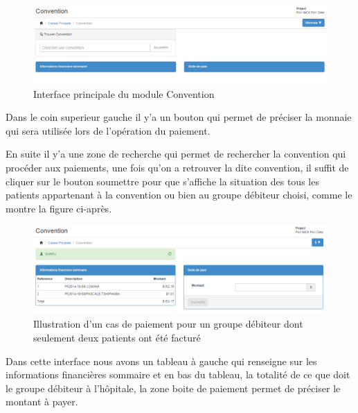 \documentclass[12pt,a4paper]{report}
\begin{document}
\begin{figure}[h]
\begin{center}
\includegraphics[width=14cm]{pic/conventionMenu.png}
\end{center}
\caption{Interface principale du module Convention}
\label{Interface principale du module Convention}
\end{figure}

Dans le coin superieur gauche il y'a un bouton qui permet de préciser la monnaie qui sera utilisée lors de l'opération du paiement.

En suite il y'a une zone de recherche qui permet de rechercher la convention qui procéder aux paiements, une fois qu'on a retrouver la dite convention, il suffit de cliquer sur le bouton soumettre pour que s'affiche la situation des tous les patients appartenant à la convention ou bien au groupe débiteur choisi, comme le montre la figure ci-après.


\begin{figure}[h]
\begin{center}
\includegraphics[width=14cm]{pic/conventionMenu2.png}
\end{center}
\caption{Illustration d'un cas de paiement pour un groupe débiteur dont seulement deux patients ont été facturé}
\label{Illustration d'un cas de paiement pour un groupe débiteur dont seulement deux patients ont été facturé}
\end{figure}
 
Dans cette interface nous avons un tableau à gauche qui renseigne sur les informations financières sommaire et en bas du tableau, la totalité de ce que doit le groupe débiteur à l'hôpitale, la zone boite de paiement permet de préciser le montant à payer.
\end{document}
